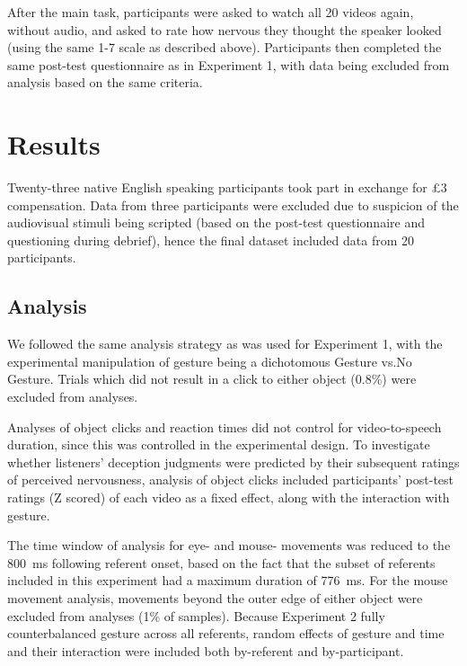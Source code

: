\documentclass[a4paper,man,natbib]{apa6}
\begin{document}
After the main task, participants were asked to watch all 20 videos again, without audio, and asked to rate how nervous they thought the speaker looked (using the same 1-7 scale as described above).
Participants then completed the same post-test questionnaire as in Experiment 1, with data being excluded from analysis based on the same criteria.

\section{Results}
Twenty-three native English speaking participants took part in exchange for \pounds{}3 compensation. 
Data from three participants were excluded due to suspicion of the audiovisual stimuli being scripted (based on the post-test questionnaire and questioning during debrief), hence the final dataset included data from 20 participants.

\subsection{Analysis}
We followed the same analysis strategy as was used for Experiment 1, with the experimental manipulation of gesture being a dichotomous Gesture vs.\@ No Gesture.
Trials which did not result in a click to either object (0.8\%) were excluded from analyses.

Analyses of object clicks and reaction times did not control for video-to-speech duration, since this was controlled in the experimental design.
To investigate whether listeners' deception judgments were predicted by their subsequent ratings of perceived nervousness, analysis of object clicks included participants' post-test ratings (Z scored) of each video as a fixed effect, along with the interaction with gesture.

The time window of analysis for eye- and mouse- movements was reduced to the 800~ms following referent onset, based on the fact that the subset of referents included in this experiment had a maximum duration of 776~ms. 
For the mouse movement analysis, movements beyond the outer edge of either object were excluded from analyses (1\% of samples).
Because Experiment 2 fully counterbalanced gesture across all referents, random effects of gesture and time and their interaction were included both by-referent and by-participant.
\end{document}

